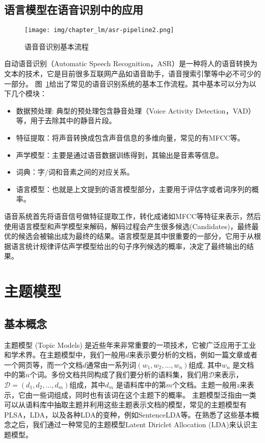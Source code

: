 \subsection{语言模型在语音识别中的应用}

\begin{figure}[h!]
	\begin{center}
		\texttt{[image: img/chapter\_lm/asr-pipeline2.png]}
		\caption{语音音识别基本流程}
		\label{pic:asr}
	\end{center}
\end{figure}

自动语音识别（Automatic Speech Recognition，ASR）是一种将人的语音转换为文本的技术，它是目前很多互联网产品如语音助手，语音搜索引擎等中必不可少的一部分。
图~\ref{pic:asr}给出了常见的语音识别系统的基本工作流程。其中基本可以分为以下几个模块：
\begin{itemize}
    \item 数据预处理: 典型的预处理包含静音处理（Voice Activity Detection，VAD）等，用于去除其中的静音片段。
	\item 特征提取：将声音转换成包含声音信息的多维向量，常见的有MFCC等。
	\item 声学模型：主要是通过语音数据训练得到，其输出是音素等信息。
	\item 词典：字/词和音素之间的对应关系。
	\item 语言模型：也就是上文提到的语言模型部分，主要用于评估字或者词序列的概率。
\end{itemize}

\noindent 语音系统首先将语音信号做特征提取工作，转化成诸如MFCC等特征来表示，然后使用语言模型和声学模型来解码，解码过程会产生很多候选(Candidates)，最终最优的候选会被输出成为最终的结果。语言模型是其中很重要的一部分，它用于从根据语言统计规律评估声学模型给出的句子序列候选的概率，决定了最终输出的结果。 
\section{主题模型}

\subsection{基本概念}
主题模型 (Topic Models) 是近些年来非常重要的一项技术，它被广泛应用于工业和学术界。在主题模型中，我们一般用$d$来表示要分析的文档，例如一篇文章或者一个网页等，而一个文档$d$通常由一系列词$(w_1, w_2, ..., w_n)$组成, 其中$w_n$ 是文档中的第$n$个词。多份文档共同构成了我们要分析的语料集，我们用$\mathcal{D}$来表示，$\mathcal{D}=(d_1, d_2, ..., d_m)$组成，其中$d_m$ 是语料库中的第$m$个文档。主题一般用$z$来表示，它由一些词组成，同时也有该词在这个主题下的概率。
主题模型泛指由一类可以从语料库中抽取主题并利用这些主题表示文档的模型，常见的主题模型有PLSA，LDA，以及各种LDA的变种，例如SentenceLDA等。在熟悉了这些基本概念之后，我们通过一种常见的主题模型Latent Diriclet Allocation (LDA)来认识主题模型。


